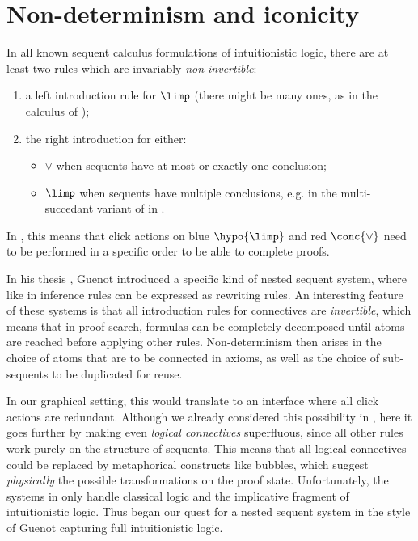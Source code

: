 \section{Non-determinism and iconicity}

In all known sequent calculus formulations of intuitionistic logic, there are at
least two rules which are invariably \emph{non-invertible}:
\begin{enumerate}
  \item a left introduction rule for $\limp$ (there might be many ones, as in
  the calculus  of );
  \item the right introduction for either:
    \begin{itemize}
      \item $\lor$ when sequents have at most or exactly one conclusion;
      \item $\limp$ when sequents have multiple conclusions, e.g. in the
        multi-succedant variant of  in
        \cite{dyckhoff_contraction-free_1992}.
    \end{itemize}
\end{enumerate}
In , this means that click actions on blue $\hypo{\limp}$ and red
$\conc{\lor}$ need to be performed in a specific order to be able to complete
proofs.

In his thesis \cite{guenot_nested_2013}, Guenot introduced a specific kind of
nested sequent system, where like in  inference rules can be expressed
as rewriting rules. An interesting feature of these systems is that all
introduction rules for connectives are \emph{invertible}, which means that in
proof search, formulas can be completely decomposed until atoms are reached
before applying other rules. Non-determinism then arises in the choice of atoms
that are to be connected in axioms, as well as the choice of sub-sequents to be
duplicated for reuse.

In our graphical setting, this would translate to an interface where all click
actions are redundant. Although we already considered this possibility in
, here it goes further by making even \emph{logical
connectives} superfluous, since all other rules work purely on the structure of
sequents. This means that all logical connectives could be replaced by
metaphorical constructs like bubbles, which suggest \emph{physically} the
possible transformations on the proof state. Unfortunately, the systems in
\cite{guenot_nested_2013} only handle classical logic and the implicative
fragment of intuitionistic logic. Thus began our quest for a nested sequent
system in the style of Guenot capturing full intuitionistic logic.


